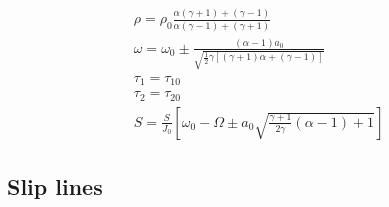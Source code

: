 \begin{equation}
\label{eq:UCS-Rankine-Hugoniot}
\begin{array}{l}
\rho  = {\rho _0}\frac{{\alpha \left( {\gamma  + 1} \right) + \left( {\gamma  - 1} \right)}}{{\alpha \left( {\gamma  - 1} \right) + \left( {\gamma  + 1} \right)}}\\
\omega  = {\omega _0} \pm \frac{{\left( {\alpha  - 1} \right){a_0}}}{{\sqrt {\frac{1}{2}\gamma \left[ {\left( {\gamma  + 1} \right)\alpha  + \left( {\gamma  - 1} \right)} \right]} }}\\
{\tau _1} = {\tau _{10}}\\
{\tau _2} = {\tau _{20}}\\
S = \frac{S}{{{J_0}}}\left[ {{\omega _0} - \Omega  \pm {a_0}\sqrt {\frac{{\gamma  + 1}}{{2\gamma }}\left( {\alpha  - 1} \right) + 1} } \right]
\end{array}
\end{equation}

\subsection{Slip lines}

